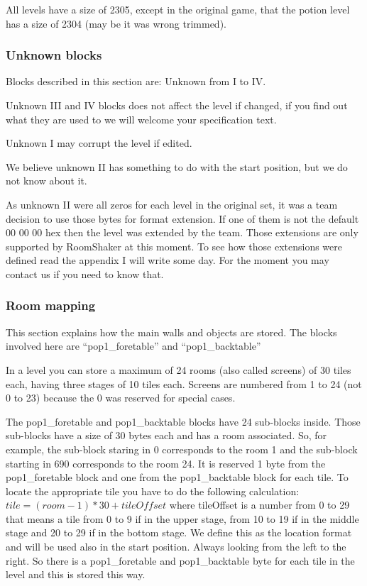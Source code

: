 \documentclass{article}
\begin{document}
 All levels have a size of 2305, except in the original game, that the
 potion level has a size of 2304 (may be it was wrong trimmed).

\subsubsection{Unknown blocks} %
 Blocks described in this section are: Unknown from I to IV.

 Unknown III and IV blocks does not affect the level if changed, if you
 find out what they are used to we will welcome your specification text.

 Unknown I may corrupt the level if edited.

 We believe unknown II has something to do with the start position, but we
 do not know about it.

 As unknown II were all zeros for each level in the original set, it was a
 team decision to use those bytes for format extension. If one of them is
 not the default 00 00 00 hex then the level was extended by the team.
 Those extensions are only supported by RoomShaker at this  moment. To see
 how those extensions were defined read the appendix I will write some day.
 For the moment you may contact us if you need to know that.

\subsubsection{Room mapping\label{room mapping}} %
 This section explains how the main walls and objects are stored. The
 blocks involved here are ``pop1\_foretable'' and ``pop1\_backtable''

 In a level you can store a maximum of 24 rooms (also called screens) of 30
 tiles each, having three stages of 10 tiles each. Screens are numbered
 from 1 to 24 (not 0 to 23) because the 0 was reserved for special cases.

 The pop1\_foretable and pop1\_backtable blocks have 24 sub-blocks inside.
 Those sub-blocks have a size of 30 bytes each and has a room associated.
 So, for example, the sub-block staring in 0 corresponds to the room 1 and
 the sub-block starting in 690 corresponds to the room 24.
 It is reserved 1 byte from the pop1\_foretable block and one from the
 pop1\_backtable block for each tile. To locate the appropriate tile you
 have to do the following calculation: $tile=(room-1)*30+tileOffset$ where
 tileOffset is a number from 0 to 29 that means a tile from 0 to 9 if in
 the upper stage, from 10 to 19 if in the middle stage and 20 to 29 if in
 the bottom stage. We define this as the location format and will be used
 also in the start position.
 Always looking from the left to the right.
 So there is a pop1\_foretable and pop1\_backtable byte for each tile in the
 level and this is stored this way.
\end{document}
